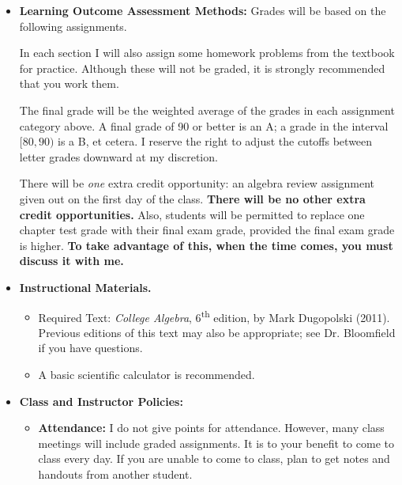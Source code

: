 \documentclass{article}
\begin{document}
\begin{itemize}
\item \textbf{Learning Outcome Assessment Methods:} Grades will be based on the following assignments.
In each section I will also assign some homework problems from the textbook for practice. Although these will not be graded, it is strongly recommended that you work them.

The final grade will be the weighted average of the grades in each assignment category above. A final grade of 90 or better is an A; a grade in the interval $[80,90)$ is a B, et cetera. I reserve the right to adjust the cutoffs between letter grades downward at my discretion.

There will be \emph{one} extra credit opportunity: an algebra review assignment given out on the first day of the class. \textbf{There will be no other extra credit opportunities.} Also, students will be permitted to replace one chapter test grade with their final exam grade, provided the final exam grade is higher. \textbf{To take advantage of this, when the time comes, you must discuss it with me.}


\item \textbf{Instructional Materials.} 
\begin{itemize}
\item Required Text: \emph{College Algebra}, 6\textsuperscript{th} edition, by Mark Dugopolski (2011). Previous editions of this text may also be appropriate; see Dr. Bloomfield if you have questions.
\item A basic scientific calculator is recommended.
\end{itemize}

\item \textbf{Class and Instructor Policies:}
\begin{itemize}
\item \textbf{Attendance:} I do not give points for attendance. However, many class meetings will include graded assignments. It is to your benefit to come to class every day. If you are unable to come to class, plan to get notes and handouts from another student.


\end{itemize}
\end{itemize}
\end{document}
